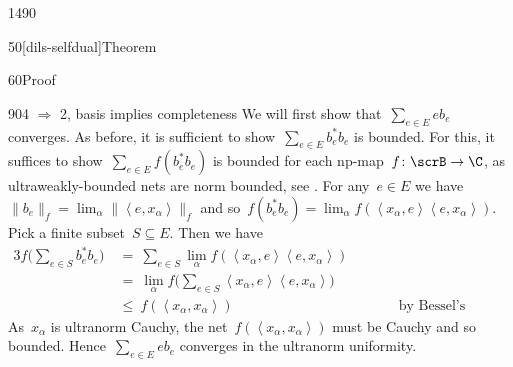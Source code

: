 \begin{parsec}{1490}
\begin{point}{50}[dils-selfdual]{Theorem}
\begin{point}{60}{Proof}
\begin{point}{90}{4 $\Rightarrow$ 2, basis implies completeness}
We will first show that~$\sum_{e \in E} e b_e$ converges.
As before, it is sufficient to show~$\sum_{e \in E} b_e^*b_e$ is bounded.
For this, it suffices to show~$\sum_{e\in E} f( b_e^*b_e ) $ is bounded
        for each np-map~$f\colon \scrB \to \C$,
    as ultraweakly-bounded nets are norm bounded,
    see .
For any~$e \in E$
    we have~$\|b_e\|_f = \lim_\alpha \|\left<e,x_\alpha\right>\|_f$
    and so~$f(b_e^*b_e) =\lim_\alpha f(\left<x_\alpha,e\right> \left<e, x_\alpha\right>)$.
    Pick a finite subset~$S \subseteq E$. Then we have
\begin{alignat*}{3}
    f\bigl(\sum_{e \in S} b_e^*b_e\bigr)
    &\ =\  \sum_{e \in S} \lim_\alpha 
     f(\left<x_\alpha,e\right> \left<e, x_\alpha\right>) \\
     &\  = \ \lim_\alpha 
            f\bigl(\sum_{e \in S}\left<x_\alpha,e\right>
                \left<e, x_\alpha\right>\bigr) \\
            &\ \leq\  f(\left<x_\alpha,x_\alpha\right>)
                &\qquad&\text{by Bessel's inequality.}
 \end{alignat*}
As~$x_\alpha$ is ultranorm Cauchy,
the net~$f(\left<x_\alpha,x_\alpha\right>)$
    must be Cauchy and so bounded.
Hence~$\sum_{e \in E} e b_e$ converges in the ultranorm uniformity.


\end{point}
\end{point}
\end{point}
\end{parsec}
